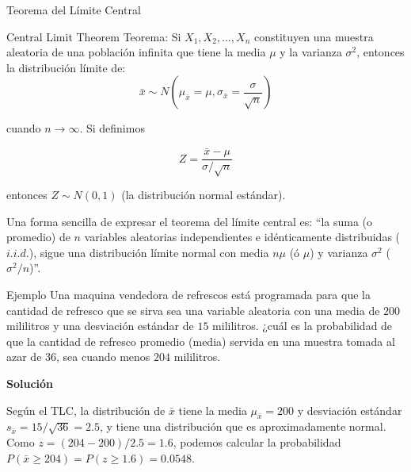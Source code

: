 \documentclass[
  10pt,
  ignorenonframetext,
]{beamer}
\begin{document}
\begin{frame}{Teorema del Límite Central}
\protect\hypertarget{teorema-del-luxedmite-central}{}
\begin{block}{Central Limit Theorem}
\protect\hypertarget{central-limit-theorem}{}
Teorema: Si \(X_1, X_2, \ldots, X_n\) constituyen una muestra aleatoria
de una población infinita que tiene la media \(\mu\) y la varianza
\(\sigma^2\), entonces la distribución límite de:
\[\bar{x} \sim N\left(\mu_{\bar{x}}=\mu,\sigma_{\bar{x}}=\frac{\sigma}{\sqrt{n}}\right)\]

cuando \(n \to \infty\). Si definimos

\[Z=\frac{\bar{x}-\mu}{{\sigma}/{\sqrt{n}}}\]

entonces \(Z \sim N(0,1)\) (la distribución normal estándar).
\end{block}

\begin{block}{}
\protect\hypertarget{section-20}{}
Una forma sencilla de expresar el teorema del límite central es: ``la
suma (o promedio) de \(n\) variables aleatorias independientes e
idénticamente distribuidas (\(i.i.d.\)), sigue una distribución límite
normal con media \(n\mu\) (ó \(\mu\)) y varianza \(\sigma^2\)
(\(\sigma^2 /n\))''.
\end{block}
\end{frame}

\begin{frame}{}
\protect\hypertarget{section-21}{}
\begin{block}{Ejemplo}
\protect\hypertarget{ejemplo}{}
Una maquina vendedora de refrescos está programada para que la cantidad
de refresco que se sirva sea una variable aleatoria con una media de
\(200\) mililitros y una desviación estándar de \(15\) mililitros. ¿cuál
es la probabilidad de que la cantidad de refresco promedio (media)
servida en una muestra tomada al azar de \(36\), sea cuando menos
\(204\) mililitros.

\textbf{Solución}

Según el TLC, la distribución de \(\bar{x}\) tiene la media
\(\mu_{\bar{x}}=200\) y desviación estándar
\(s_{\bar{x}}=15/\sqrt{36}= 2.5\), y tiene una distribución que es
aproximadamente normal. Como \(z =(204 -200)/2.5 = 1.6\), podemos
calcular la probabilidad \(P(\bar{x} \ge 204) = P(z \ge 1.6) = 0.0548\).
\end{block}
\end{frame}
\end{document}

